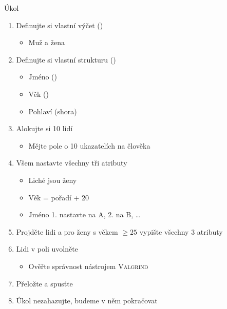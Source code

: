 \begin{frame}{Úkol}

  \begin{enumerate}
    \item Definujte si vlastní výčet () 
    \begin{itemize}
      \item Muž a žena
    \end{itemize}

    \item Definujte si vlastní strukturu () 
    \begin{itemize}
      \item Jméno ()
      \item Věk ()
      \item Pohlaví (shora)
    \end{itemize}

    \item Alokujte si 10 lidí
    \begin{itemize}
      \item Mějte pole o 10 ukazatelích na člověka
    \end{itemize}

    \item Všem nastavte všechny tři atributy
    \begin{itemize}
      \item Liché jsou ženy
      \item Věk = pořadí + 20
      \item Jméno 1. nastavte na A, 2. na B, \dots
    \end{itemize}

    \item Projděte lidi a pro ženy s věkem $\ge 25$ vypište všechny 3 atributy

    \item Lidi v poli uvolněte
    \begin{itemize}
      \item Ověřte správnost nástrojem \textsc{Valgrind}
    \end{itemize}

    \item Přeložte a spusťte
    \item Úkol nezahazujte, budeme v něm pokračovat
  \end{enumerate}

\end{frame}

